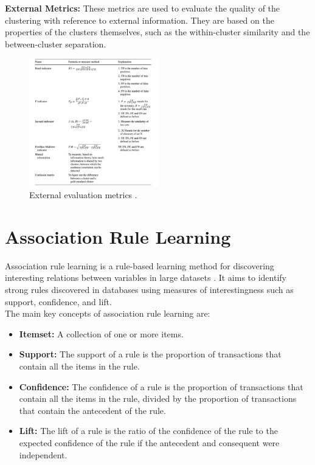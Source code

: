 \documentclass[conference]{IEEEtran}
\begin{document}
\textbf{External Metrics:} These metrics are used to evaluate the quality of the clustering with reference to external information. They are based on the properties of the clusters themselves, such as the within-cluster similarity and the between-cluster separation. \\

\begin{figure}[h]
    \centering
    \includegraphics[width=0.5\textwidth]{external_eval.png}
    \caption{External evaluation metrics \cite{saxena2017clustering}.}
    \label{fig:external_eval}
\end{figure}

\section{Association Rule Learning}

Association rule learning is a rule-based learning method for discovering interesting relations between variables in large datasets \cite{agrawal1993mining}. It aims to identify strong rules discovered in databases using measures of interestingness such as support, confidence, and lift. \\

The main key concepts of association rule learning are:
\begin{itemize}
    \item \textbf{Itemset:} A collection of one or more items.
    \item \textbf{Support:} The support of a rule is the proportion of transactions that contain all the items in the rule.
    \item \textbf{Confidence:} The confidence of a rule is the proportion of transactions that contain all the items in the rule, divided by the proportion of transactions that contain the antecedent of the rule.
    \item \textbf{Lift:} The lift of a rule is the ratio of the confidence of the rule to the expected confidence of the rule if the antecedent and consequent were independent.
\end{itemize}
\end{document}
